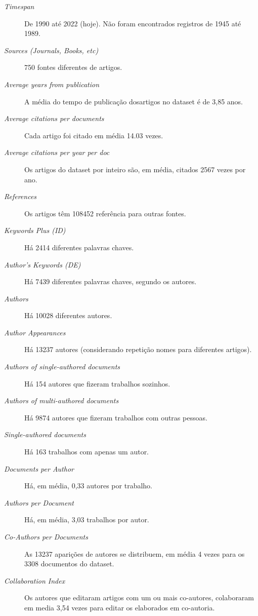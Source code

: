 \begin{description}
    \item [\textit{Timespan}] De 1990 até 2022 (hoje). Não foram encontrados registros de 1945 até 1989.
    \item [\textit{Sources (Journals, Books, etc)}] 750 fontes diferentes de artigos.
    \item [\textit{Average years from publication}] A média do tempo de publicação dosartigos no dataset é de 3,85 anos.
    \item [\textit{Average citations per documents}] Cada artigo foi citado em média 14.03 vezes.
    \item [\textit{Average citations per year per doc}] Os artigos do dataset por inteiro são, em média, citados 2567 vezes por ano.
    \item [\textit{References}] Os artigos têm 108452 referência para outras fontes.
    \item [\textit{Keywords Plus (ID)}] Há 2414 diferentes palavras chaves.
    \item [\textit{Author's Keywords (DE)}] Há 7439 diferentes palavras chaves, segundo os autores.
    \item [\textit{Authors}] Há 10028 diferentes autores.
    \item [\textit{Author Appearances}] Há 13237 autores (considerando repetição nomes para diferentes artigos).
    \item [\textit{Authors of single-authored documents}] Há 154 autores que fizeram trabalhos sozinhos.
    \item [\textit{Authors of multi-authored documents}] Há 9874 autores que fizeram trabalhos com outras pessoas.
    \item [\textit{Single-authored documents}] Há 163 trabalhos com apenas um autor.
    \item [\textit{Documents per Author}] Há, em média, 0,33 autores por trabalho.
    \item [\textit{Authors per Document}] Há, em média, 3,03 trabalhos por autor.
    \item [\textit{Co-Authors per Documents}] As 13237 aparições de autores se distribuem, em média 4 vezes para os 3308 documentos do dataset.
    \item [\textit{Collaboration Index}] Os autores que editaram artigos com um ou mais co-autores, colaboraram em media 3,54 vezes para editar os elaborados em co-autoria.
\end{description}

